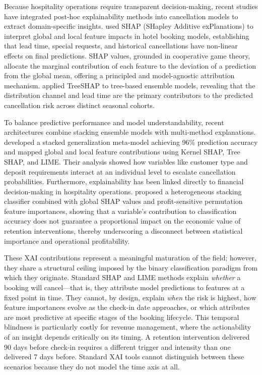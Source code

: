 \documentclass[pdflatex,sn-mathphys-ay]{sn-jnl}
\theoremstyle{thmstyleone}%
\theoremstyle{thmstyletwo}%
\theoremstyle{thmstylethree}%
\begin{document}
Because hospitality operations require transparent decision-making, recent studies have integrated post-hoc explainability methods into cancellation models to extract domain-specific insights. \cite{gomez2025machine} used SHAP (SHapley Additive exPlanations) to interpret global and local feature impacts in hotel booking models, establishing that lead time, special requests, and historical cancellations have non-linear effects on final predictions. SHAP values, grounded in cooperative game theory, allocate the marginal contribution of each feature to the deviation of a prediction from the global mean, offering a principled and model-agnostic attribution mechanism. \cite{herrera2024machine} applied TreeSHAP to tree-based ensemble models, revealing that the distribution channel and lead time are the primary contributors to the predicted cancellation risk across distinct seasonal cohorts.

To balance predictive performance and model understandability, recent architectures combine stacking ensemble models with multi-method explanations. \cite{talal2025hotel} developed a stacked generalization meta-model achieving 96\% prediction accuracy and mapped global and local feature contributions using Kernel SHAP, Tree SHAP, and LIME. Their analysis showed how variables like customer type and deposit requirements interact at an individual level to escalate cancellation probabilities. Furthermore, explainability has been linked directly to financial decision-making in hospitality operations. \cite{liu2025explainable} proposed a heterogeneous stacking classifier combined with global SHAP values and profit-sensitive permutation feature importances, showing that a variable's contribution to classification accuracy does not guarantee a proportional impact on the economic value of retention interventions, thereby underscoring a disconnect between statistical importance and operational profitability.

These XAI contributions represent a meaningful maturation of the field; however, they share a structural ceiling imposed by the binary classification paradigm from which they originate. Standard SHAP and LIME methods explain \textit{whether} a booking will cancel—that is, they attribute model predictions to features at a fixed point in time. They cannot, by design, explain \textit{when} the risk is highest, how feature importances evolve as the check-in date approaches, or which attributes are most predictive at specific stages of the booking lifecycle. This temporal blindness is particularly costly for revenue management, where the actionability of an insight depends critically on its timing. A retention intervention delivered 90 days before check-in requires a different trigger and intensity than one delivered 7 days before. Standard XAI tools cannot distinguish between these scenarios because they do not model the time axis at all.
\end{document}
